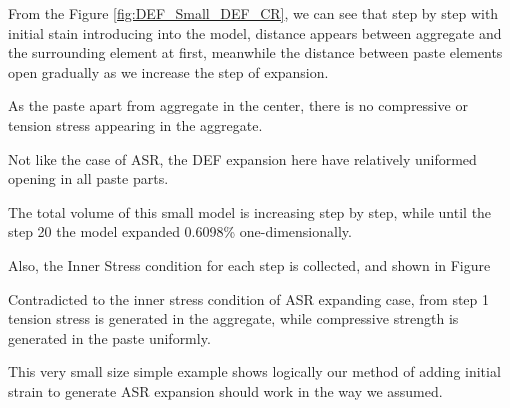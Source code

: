 From the Figure \ref{fig:DEF_Small_DEF_CR}, we can see that step by step with initial stain introducing into the model, distance appears between aggregate and the surrounding element at first, meanwhile the distance between paste elements open gradually as we increase the step of expansion.

As the paste apart from aggregate in the center, there is no compressive or tension stress appearing in the aggregate. 

Not like the case of ASR, the DEF expansion here have relatively uniformed opening in all paste parts.

The total volume of this small model is increasing step by step, while until the step 20 the model expanded 0.6098\% one-dimensionally.


Also, the Inner Stress condition for each step is collected, and shown in Figure %

Contradicted to the inner stress condition of ASR expanding case, from step 1 tension stress is generated in the aggregate, while compressive strength is generated in the paste uniformly.

This very small size simple example shows logically our method of adding initial strain to generate ASR expansion should work in the way we assumed.
